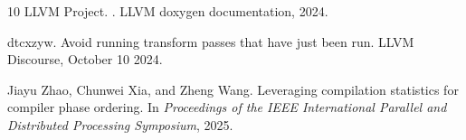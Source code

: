 \documentclass{article}
\begin{document}
\begin{thebibliography}{10}
LLVM Project.
.
\newblock LLVM doxygen documentation, 2024.

dtcxzyw.
\newblock [{RFC}][{Pipeline}] Avoid running transform passes that have just
been run.
\newblock LLVM Discourse, October 10 2024.

Jiayu Zhao, Chunwei Xia, and Zheng Wang.
\newblock Leveraging compilation statistics for compiler phase ordering.
\newblock In \emph{Proceedings of the IEEE International Parallel and
Distributed Processing Symposium}, 2025.

\end{thebibliography}
\end{document}
